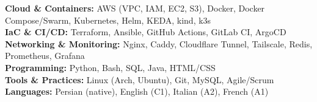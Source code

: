 \documentclass[a4paper,11pt]{article}
\begin{document}
\begin{itemize}[leftmargin=0in, label={}]
\small{\item{

\textbf{Cloud \& Containers:} AWS (VPC, IAM, EC2, S3), Docker, Docker Compose/Swarm, Kubernetes, Helm, KEDA, kind, k3s \\

\textbf{IaC \& CI/CD:} Terraform, Ansible, GitHub Actions, GitLab CI, ArgoCD \\

\textbf{Networking \& Monitoring:} Nginx, Caddy, Cloudflare Tunnel, Tailscale, Redis, Prometheus, Grafana \\

\textbf{Programming:} Python, Bash, SQL, Java, HTML/CSS \\

\textbf{Tools \& Practices:} Linux (Arch, Ubuntu), Git, MySQL, Agile/Scrum \\

\textbf{Languages:} Persian (native), English (C1), Italian (A2), French (A1)

}}
\end{itemize}


\end{document}
